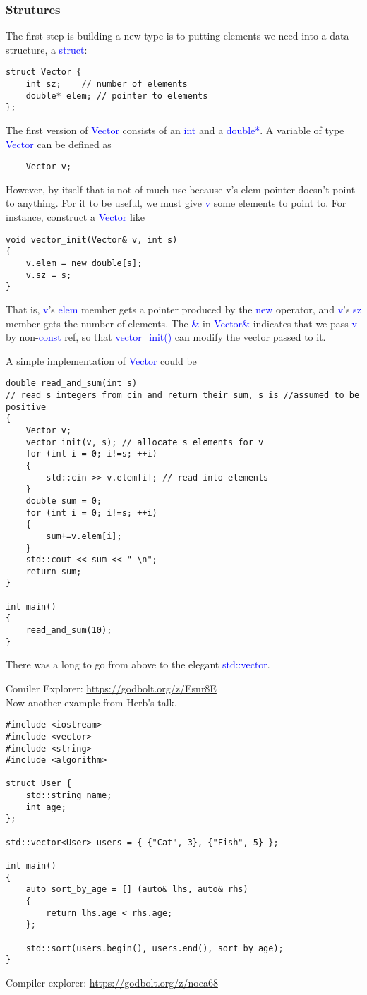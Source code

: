 \documentclass{article}
\newcommand{\blue}[1]{\textcolor{blue}{#1}}
\begin{document}
\subsubsection{Strutures}

The first step is building a new type is to putting elements we need into a data structure, a \blue{struct}:

\begin{verbatim}
struct Vector {
    int sz;    // number of elements
    double* elem; // pointer to elements
};	
\end{verbatim}
The first version of \blue{Vector} consists of an \blue{int} and a \blue{double*}. A variable of type \blue{Vector} can be defined as 
\begin{verbatim}
	Vector v;
\end{verbatim}
However, by itself that is not of much use because v's elem pointer doesn't point to anything. For it to be useful, we must give \blue{v} some elements to point to. For instance, construct a \blue{Vector} like
\begin{verbatim}
void vector_init(Vector& v, int s)
{
    v.elem = new double[s];
    v.sz = s;
}	
\end{verbatim}
That is, \blue{v}'s \blue{elem} member gets a pointer produced by the \blue{new} operator, and \blue{v}'s \blue{sz} member gets the number of elements. The \blue{\&} in \blue{Vector\&} indicates that we pass \blue{v} by non-\blue{const} ref, so that \blue{vector\_init()} can modify the vector passed to it.

A simple implementation of \blue{Vector} could be 
\begin{verbatim}
double read_and_sum(int s)
// read s integers from cin and return their sum, s is //assumed to be positive
{
    Vector v;
    vector_init(v, s); // allocate s elements for v
    for (int i = 0; i!=s; ++i)
    {
        std::cin >> v.elem[i]; // read into elements
    }
    double sum = 0;
    for (int i = 0; i!=s; ++i)
    {
        sum+=v.elem[i];
    }
    std::cout << sum << " \n";
    return sum;
}

int main()
{
    read_and_sum(10);
}	
\end{verbatim}
There was a long to go from above to the elegant \blue{std::vector}.

Comiler Explorer: \url{https://godbolt.org/z/Esnr8E}
\\

Now another example from Herb's talk.
\begin{verbatim}
#include <iostream>
#include <vector>
#include <string>
#include <algorithm>

struct User {
    std::string name;
    int age;
};

std::vector<User> users = { {"Cat", 3}, {"Fish", 5} };

int main()
{
    auto sort_by_age = [] (auto& lhs, auto& rhs)
    {
        return lhs.age < rhs.age;
    };

    std::sort(users.begin(), users.end(), sort_by_age);
}
\end{verbatim}
Compiler explorer: \url{https://godbolt.org/z/noea68}
\end{document}
